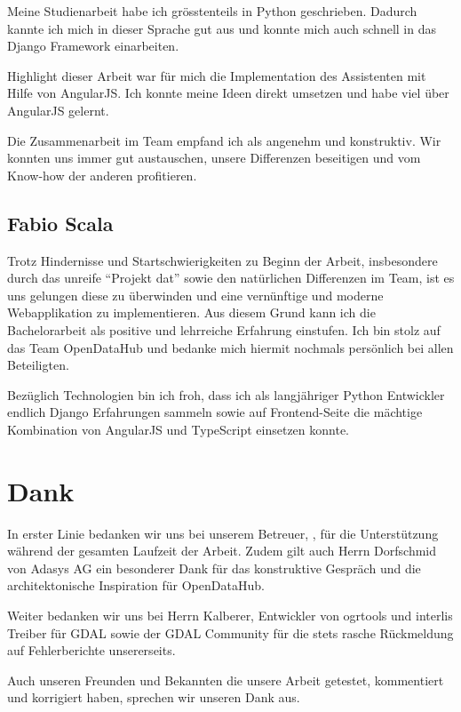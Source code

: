Meine Studienarbeit habe ich grösstenteils in Python geschrieben. Dadurch kannte ich mich in dieser Sprache gut aus und konnte mich auch schnell in das Django Framework einarbeiten.

Highlight dieser Arbeit war für mich die Implementation des Assistenten mit Hilfe von AngularJS. Ich konnte meine Ideen direkt umsetzen und habe viel über AngularJS gelernt.

Die Zusammenarbeit im Team empfand ich als angenehm und konstruktiv. Wir konnten uns immer gut austauschen, unsere Differenzen beseitigen und vom Know-how der anderen profitieren.

\subsection{Fabio Scala}
Trotz Hindernisse und Startschwierigkeiten zu Beginn der Arbeit, insbesondere durch das unreife ``Projekt dat'' sowie den natürlichen Differenzen im Team, ist es uns gelungen diese zu überwinden und eine vernünftige und moderne Webapplikation zu implementieren. Aus diesem Grund kann ich die Bachelorarbeit als positive und lehrreiche Erfahrung einstufen. Ich bin stolz auf das Team OpenDataHub und bedanke mich hiermit nochmals persönlich bei allen Beteiligten.

Bezüglich Technologien bin ich froh, dass ich als langjähriger Python Entwickler endlich Django Erfahrungen sammeln sowie auf Frontend-Seite die mächtige Kombination von AngularJS und TypeScript einsetzen konnte.


\section{Dank}
In erster Linie bedanken wir uns bei unserem Betreuer, \proff, für die Unterstützung während der gesamten Laufzeit der Arbeit. Zudem gilt auch Herrn Dorfschmid von Adasys AG ein besonderer Dank für das konstruktive Gespräch und die architektonische Inspiration für OpenDataHub. 

Weiter bedanken wir uns bei Herrn Kalberer, Entwickler von ogrtools und \gls{interlis} Treiber für GDAL sowie der GDAL Community für die stets rasche Rückmeldung auf Fehlerberichte unsererseits.

Auch unseren Freunden und Bekannten die unsere Arbeit getestet, kommentiert und korrigiert haben, sprechen wir unseren Dank aus.
